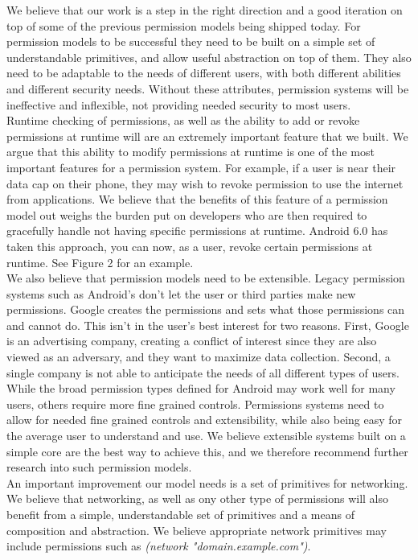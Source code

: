 We believe that our work is a step in the right direction and a good iteration on top of some of the previous permission models being shipped today. 
For permission models to be successful they need to be built on a simple set of understandable primitives, and allow useful abstraction on top of them.
They also need to be adaptable to the needs of different users, with both different abilities and different security needs.
Without these attributes, permission systems will be ineffective and inflexible, not providing needed security to most users.
\\
Runtime checking of permissions, as well as the ability to add or revoke permissions at runtime will are an extremely important feature that we built. We argue that this ability to modify permissions at runtime is one of the most important features for a permission system. For example, if a user is near their data cap on their phone, they may wish to revoke permission to use the internet from applications. We believe that the benefits of this feature of a permission model out weighs the burden put on developers who are then required to gracefully handle not having specific permissions at runtime. Android 6.0 has taken this approach\cite{android}, you can now, as a user, revoke certain permissions at runtime. See Figure 2 for an example.\\

We also believe that permission models need to be extensible.
Legacy permission systems such as Android's don't let the user or third parties make new permissions. 
Google creates the permissions and sets what those permissions can and cannot do. 
This isn't in the user's best interest for two reasons. 
First, Google is an advertising company, creating a conflict of interest since they are also viewed as an adversary, and they want to maximize data collection.  
Second, a single company is not able to anticipate the needs of all different types of users.  While the broad permission types defined for Android may work well for many users, others require more fine grained controls.
Permissions systems need to allow for needed fine grained controls and extensibility, while also being easy for the average user to understand and use.
We believe extensible systems built on a simple core are the best way to achieve this, and we therefore recommend further research into such permission models.
\\

An important improvement our model needs is a set of primitives for networking.  We believe that networking, as well as ony other type of permissions will also benefit from a simple, understandable set of primitives and a means of composition and abstraction.  We believe appropriate network primitives may include permissions such as \textit{(network "domain.example.com")}.

